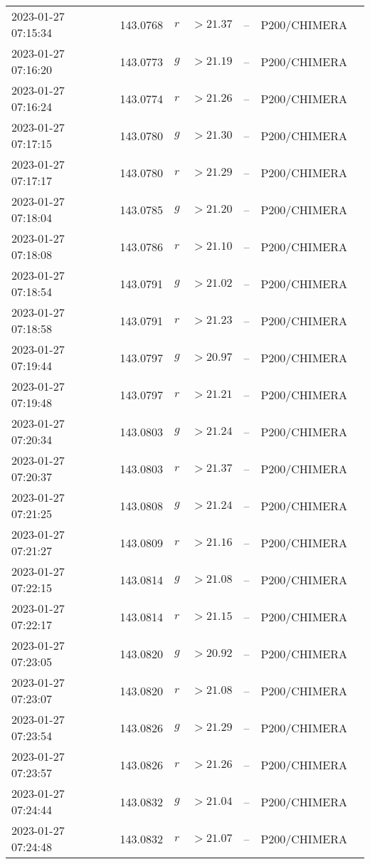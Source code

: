 \documentclass{nature_plusfigure}
\begin{document}
\begin{supplement}
\begin{center}
\begin{longtable}{lllllll}
2023-01-27 07:15:34 & 143.0768 & $r$ & $>21.37$ & -- & P200/CHIMERA &  \\ 
2023-01-27 07:16:20 & 143.0773 & $g$ & $>21.19$ & -- & P200/CHIMERA &  \\ 
2023-01-27 07:16:24 & 143.0774 & $r$ & $>21.26$ & -- & P200/CHIMERA &  \\ 
2023-01-27 07:17:15 & 143.0780 & $g$ & $>21.30$ & -- & P200/CHIMERA &  \\ 
2023-01-27 07:17:17 & 143.0780 & $r$ & $>21.29$ & -- & P200/CHIMERA &  \\ 
2023-01-27 07:18:04 & 143.0785 & $g$ & $>21.20$ & -- & P200/CHIMERA &  \\ 
2023-01-27 07:18:08 & 143.0786 & $r$ & $>21.10$ & -- & P200/CHIMERA &  \\ 
2023-01-27 07:18:54 & 143.0791 & $g$ & $>21.02$ & -- & P200/CHIMERA &  \\ 
2023-01-27 07:18:58 & 143.0791 & $r$ & $>21.23$ & -- & P200/CHIMERA &  \\ 
2023-01-27 07:19:44 & 143.0797 & $g$ & $>20.97$ & -- & P200/CHIMERA &  \\ 
2023-01-27 07:19:48 & 143.0797 & $r$ & $>21.21$ & -- & P200/CHIMERA &  \\ 
2023-01-27 07:20:34 & 143.0803 & $g$ & $>21.24$ & -- & P200/CHIMERA &  \\ 
2023-01-27 07:20:37 & 143.0803 & $r$ & $>21.37$ & -- & P200/CHIMERA &  \\ 
2023-01-27 07:21:25 & 143.0808 & $g$ & $>21.24$ & -- & P200/CHIMERA &  \\ 
2023-01-27 07:21:27 & 143.0809 & $r$ & $>21.16$ & -- & P200/CHIMERA &  \\ 
2023-01-27 07:22:15 & 143.0814 & $g$ & $>21.08$ & -- & P200/CHIMERA &  \\ 
2023-01-27 07:22:17 & 143.0814 & $r$ & $>21.15$ & -- & P200/CHIMERA &  \\ 
2023-01-27 07:23:05 & 143.0820 & $g$ & $>20.92$ & -- & P200/CHIMERA &  \\ 
2023-01-27 07:23:07 & 143.0820 & $r$ & $>21.08$ & -- & P200/CHIMERA &  \\ 
2023-01-27 07:23:54 & 143.0826 & $g$ & $>21.29$ & -- & P200/CHIMERA &  \\ 
2023-01-27 07:23:57 & 143.0826 & $r$ & $>21.26$ & -- & P200/CHIMERA &  \\ 
2023-01-27 07:24:44 & 143.0832 & $g$ & $>21.04$ & -- & P200/CHIMERA &  \\ 
2023-01-27 07:24:48 & 143.0832 & $r$ & $>21.07$ & -- & P200/CHIMERA &  \\ 

\end{longtable}
\end{center}
\end{supplement}
\end{document}
